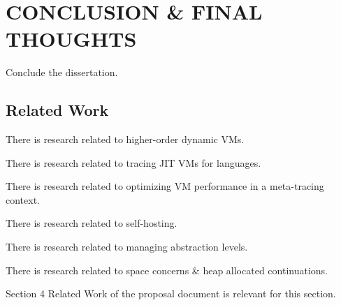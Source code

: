 \chapter[\texorpdfstring{CONCLUSION \& FINAL THOUGHTS}
                          {8. Conclusion}]{CONCLUSION \& FINAL THOUGHTS}

    \label{chapter:conclusion}

    \begin{chaptersynopsis}
        Conclude the dissertation.
    \end{chaptersynopsis}

    \section{Related Work}
        \label{section:related-work}

        \begin{mainpoint}
            There is research related to higher-order dynamic VMs.

            There is research related to tracing JIT VMs for languages.

            There is research related to optimizing VM performance in a meta-tracing context.

            There is research related to self-hosting.

            There is research related to managing abstraction levels.

            There is research related to space concerns \& heap allocated continuations.

        \end{mainpoint}

        \begin{todo}[Import]
            Section 4 Related Work of the proposal document is relevant for this section.
        \end{todo}

